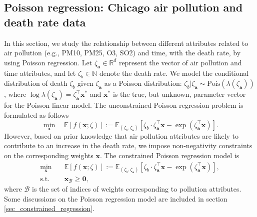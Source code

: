 \documentclass[aos]{imsart}
\numberwithin{equation}{section}
\theoremstyle{plain}
\begin{document}
\subsection{Poisson regression: Chicago air pollution and death rate data}
\label{sec:poisson_regression}
In this section, we study the relationship between different attributes related to air pollution (e.g., PM10, PM25, O3, SO2) and time, with the death rate, by using Poisson regression. 
Let $\zeta_{\bm{a}} \in \mathbb{R}^{d}$ represent the vector of air pollution and time attributes, and let $\zeta_{b} \in \mathbb{N}$ denote the death rate.
We model the conditional distribution of death $\zeta_{b}$ given $\zeta_{\bm{a}}$ as a Poisson distribution: $\zeta_{b}|\zeta_{\bm{a}}  \sim \text{Pois}(\lambda(\zeta_{\bm{a}}))$, where $\log \lambda(\zeta_{\bm{a}}) = \zeta_{\bm{a}}^{\top} \bm{x}^{*}$ and $\bm{x}^{*}$ is the true, but unknown, parameter vector for the Poisson linear model.
The unconstrained Poisson regression problem is formulated as follows 
    \begin{equation}
    \label{poisson_unconstrained}
            \min_{\bm{x}} \hspace{1em} \mathbb{E} \left[f(\bm{x};\zeta) \right] := \mathbb{E}_{(\zeta_{b},\zeta_{\bm{a}})} \left[ \zeta_{b} \cdot \zeta_{\bm{a}}^{\top} \bm{x} - \exp \left(\zeta_{\bm{a}}^{\top} \bm{x} \right) \right].
    \end{equation}
However, based on prior knowledge that air pollution attributes are likely to contribute to an increase in the death rate, we impose non-negativity constraints on the corresponding weights $\bm{x}$.
The constrained Poisson regression model is
\begin{equation}
 \label{poisson_constrained}
        \begin{split}
            \min_{\bm{x}} &  \hspace{1em} \mathbb{E} \left[f(\bm{x};\zeta) \right] := \mathbb{E}_{(\zeta_{b},\zeta_{\bm{a}})} \left[ \zeta_{b} \cdot \zeta_{\bm{a}}^{\top} \bm{x} - \exp \left(\zeta_{\bm{a}}^{\top} \bm{x} \right) \right], \\
            \text{s.t.} & \hspace{1em} \bm{x}_{\mathcal{B}} \geq \bm{0},
        \end{split}
    \end{equation}
    where $\mathcal{B}$ is the set of indices of weights corresponding to pollution attributes. 
    Some discussions on the Poisson regression model are included in section \ref{sec_constrained_regression}.
\end{document}
